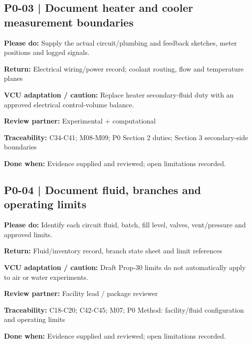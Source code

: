 \documentclass[11pt]{article}
\begin{document}
\par\noindent\begin{minipage}{\textwidth}\small\setlength{\parskip}{2pt}
\subsection*{P0-03 | Document heater and cooler measurement boundaries}
\textbf{Please do:} Supply the actual circuit/plumbing and feedback sketches, meter positions and logged signals.\par
\textbf{Return:} Electrical wiring/power record; coolant routing, flow and temperature planes\par
\textbf{VCU adaptation / caution:} Replace heater secondary-fluid duty with an approved electrical control-volume balance.\par
\textbf{Review partner:} Experimental + computational\par
\textbf{Traceability:} C34-C41; M08-M09; P0 Section 2 duties; Section 3 secondary-side boundaries\par
\textbf{Done when:} Evidence supplied and reviewed; open limitations recorded.\par
\end{minipage}\par\vspace{8pt}
\par\noindent\begin{minipage}{\textwidth}\small\setlength{\parskip}{2pt}
\subsection*{P0-04 | Document fluid, branches and operating limits}
\textbf{Please do:} Identify each circuit fluid, batch, fill level, valves, vent/pressure and approved limits.\par
\textbf{Return:} Fluid/inventory record, branch state sheet and limit references\par
\textbf{VCU adaptation / caution:} Draft Prop-30 limits do not automatically apply to air or water experiments.\par
\textbf{Review partner:} Facility lead / package reviewer\par
\textbf{Traceability:} C18-C20; C42-C45; M07; P0 Method: facility/fluid configuration and operating limits\par
\textbf{Done when:} Evidence supplied and reviewed; open limitations recorded.\par
\end{minipage}\par\vspace{8pt}
\end{document}
